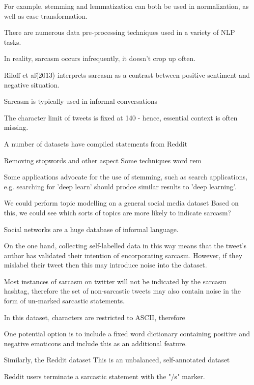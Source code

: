 \documentclass[12pt,a4paper]{article}
\begin{document}
For example, stemming and lemmatization can both be used in normalization, as well as case transformation.

There are numerous data pre-processing techniques used in a variety of NLP tasks.


In reality, sarcasm occurs infrequently, it doesn't crop up often. 


Riloff et al\. (2013) interprets sarcasm as a contrast between positive sentiment and negative situation.


Sarcasm is typically used in informal conversations



The character limit of tweets is fixed at 140 - hence, essential context is often missing. 


A number of datasets have compiled statements from Reddit \cite{wallace2014humans,khodak2017large}

Removing stopwords and other aspect
Some techniques word rem

Some applications advocate for the use of stemming, such as search applications, e.g. searching for 'deep learn' should prodce similar results to 'deep learning'. 

We could perform topic modelling on a general social media dataset
Based on this, we could see which sorts of topics are more likely to indicate sarcasm?



Social networks are a huge database of informal language. 


On the one hand, collecting self-labelled data in this way means that the tweet's author has validated their intention of encorporating sarcasm. However, if they mislabel their tweet then this may introduce noise into the dataset. 

Most instances of sarcasm on twitter will not be indicated by the sarcasm hashtag, therefore the set of non-sarcastic tweets may also contain noise in the form of un-marked sarcastic statements.

In this dataset, characters are restricted to ASCII, therefore 

One potential option is to include a fixed word dictionary containing positive and negative emoticons and include this as an additional feature.




Similarly, the Reddit dataset \cite{khodak2017large} 
This is an unbalanced, self-annotated dataset

Reddit users terminate a sarcastic statement with the "/s" marker. 
\end{document}
